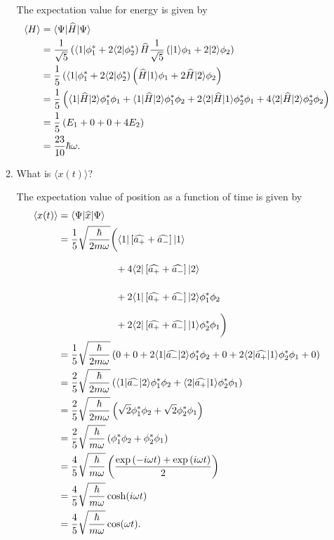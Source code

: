 \documentclass[a4paper, 12pt]{config/homework}
\begin{document}
\begin{enumerate}
\begin{enumerate}[label=(\alph*)]
The expectation value for energy is given by
\begin{align*}
\expval{H} &= \bra*{\Psi}\widehat{H}\ket*{\Psi}
\\&= \frac{1}{\sqrt{5}}\left(\bra*{1}\phi_1^* + 2\bra*{2}\phi_2^*\right)\widehat{H}\frac{1}{\sqrt{5}}\left(\ket*{1}\phi_1 + 2\ket*{2}\phi_2\right)
\\&= \frac{1}{5}\left(\bra*{1}\phi_1^* + 2\bra*{2}\phi_2^*\right)\left(\widehat{H}\ket*{1}\phi_1 + 2\widehat{H}\ket*{2}\phi_2\right)
\\&= \frac{1}{5}\left(\bra*{1}\widehat{H}\ket*{2}\phi_1^*\phi_1 + \bra*{1}\widehat{H}\ket*{2}\phi_1^*\phi_2 + 2\bra*{2}\widehat{H}\ket*{1}\phi_2^*\phi_1 + 4\bra*{2}\widehat{H}\ket*{2}\phi_2^*\phi_2\right)
\\&= \frac{1}{5}\left(E_1 + 0 + 0 + 4E_2\right)
\\&= \frac{23}{10}\hbar\omega.
\end{align*}

\pagebreak
\item What is \(\langle x(t) \rangle \)?

The expectation value of position as a function of time is given by
\begin{align*}
\expval{x(t)} &= \bra*{\Psi}\widehat{x}\ket*{\Psi}
\\&= \frac{1}{5}\sqrt{\frac{\hbar}{2m\omega}}\bigg(
\bra*{1}\left[\widehat{a_+} + \widehat{a_-}\right]\ket*{1}
\\&\phantom{=\frac{1}{5}\sqrt{\frac{\hbar}{2m\omega}}+}
+ 4\bra*{2}\left[\widehat{a_+} + \widehat{a_-}\right]\ket*{2}
\\&\phantom{=\frac{1}{5}\sqrt{\frac{\hbar}{2m\omega}}+}
+ 2\bra*{1}\left[\widehat{a_+} + \widehat{a_-}\right]\ket*{2}\phi_1^*\phi_2
\\&\phantom{=\frac{1}{5}\sqrt{\frac{\hbar}{2m\omega}}+}
+ 2\bra*{2}\left[\widehat{a_+} + \widehat{a_-}\right]\ket*{1}\phi_2^*\phi_1 \bigg)
\\&= \frac{1}{5}\sqrt{\frac{\hbar}{2m\omega}}\left(0+ 0 +
2\bra*{1}\widehat{a_-}\ket*{2}\phi_1^*\phi_2 + 0 +
2\bra*{2}\widehat{a_+}\ket*{1}\phi_2^*\phi_1 + 0
\right)
\\&= \frac{2}{5}\sqrt{\frac{\hbar}{2m\omega}}\left(
\bra*{1}\widehat{a_-}\ket*{2}\phi_1^*\phi_2 + \bra*{2}\widehat{a_+}\ket*{1}\phi_2^*\phi_1\right)
\\&= \frac{2}{5}\sqrt{\frac{\hbar}{2m\omega}}\left(\sqrt{2}\phi^*_1\phi_2 + \sqrt{2}\phi_2^*\phi_1\right)
\\&= \frac{2}{5}\sqrt{\frac{\hbar}{m\omega}}\left(\phi^*_1\phi_2 + \phi^*_2\phi_1\right)
\\&= \frac{4}{5}\sqrt{\frac{\hbar}{m\omega}}\left(\frac{\exp\left(-i\omega t\right) + \exp\left(i\omega t\right)}{2}\right)
\\&= \frac{4}{5}\sqrt{\frac{\hbar}{m\omega}}\cosh(i\omega t)
\\&= \frac{4}{5}\sqrt{\frac{\hbar}{m\omega}}\cos(\omega t).
\end{align*}


\end{enumerate}
\end{enumerate}
\end{document}
